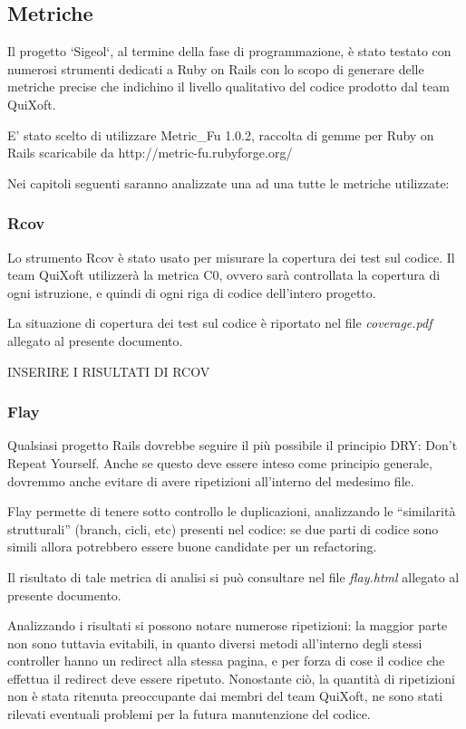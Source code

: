 \documentclass[11pt,a4paper]{article}
\begin{document}
\subsection{Metriche}
Il progetto `Sigeol`, al termine della fase di programmazione, è stato testato con numerosi strumenti dedicati a Ruby on Rails con lo scopo di generare delle metriche precise che indichino il livello qualitativo del codice prodotto dal team QuiXoft.

E' stato scelto di utilizzare Metric\_Fu 1.0.2, raccolta di gemme per Ruby on Rails scaricabile da http://metric-fu.rubyforge.org/

Nei capitoli seguenti saranno analizzate una ad una tutte le metriche utilizzate:
\subsubsection{Rcov}
Lo strumento Rcov è stato usato per misurare la copertura dei test sul codice. Il team QuiXoft utilizzerà la metrica C0, ovvero sarà controllata la copertura di ogni istruzione, e quindi di ogni riga di codice dell'intero progetto.

La situazione di copertura dei test sul codice è riportato nel file \textit{coverage.pdf} allegato al presente documento.

\begin{large}INSERIRE I RISULTATI DI RCOV\end{large}
\subsubsection{Flay}
Qualsiasi progetto Rails dovrebbe seguire il più possibile il principio DRY: Don't Repeat Yourself.
Anche se questo deve essere inteso come principio generale, dovremmo anche evitare di avere ripetizioni all’interno del medesimo file.

Flay permette di tenere sotto controllo le duplicazioni, analizzando le “similarità strutturali” (branch, cicli, etc) presenti nel codice: se due parti di codice sono simili allora potrebbero essere buone candidate per un refactoring.

Il risultato di tale metrica di analisi si può consultare nel file \textit{flay.html} allegato al presente documento.

Analizzando i risultati si possono notare numerose ripetizioni: la maggior parte non sono tuttavia evitabili, in quanto diversi metodi all'interno degli stessi controller hanno un redirect alla stessa pagina, e per forza di cose il codice che effettua il redirect deve essere ripetuto.
Nonostante ciò, la quantità di ripetizioni non è stata ritenuta preoccupante dai membri del team QuiXoft, ne sono stati rilevati eventuali problemi per la futura manutenzione del codice.
\end{document}
